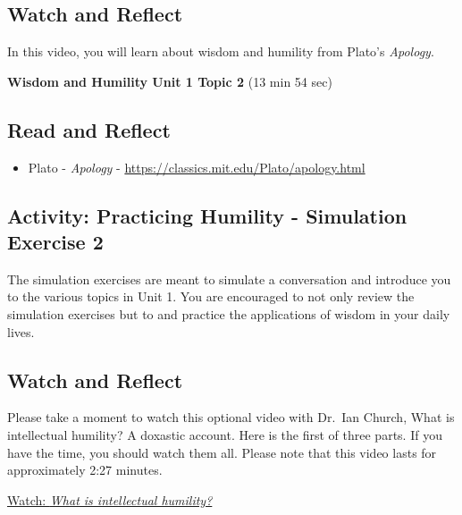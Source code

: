 \documentclass[
]{book}
\providecommand{\tightlist}{%
  \setlength{\itemsep}{0pt}\setlength{\parskip}{0pt}}
\begin{document}
\hypertarget{watch-and-reflect-1}{%
\subsection*{Watch and Reflect}\label{watch-and-reflect-1}}

In this video, you will learn about wisdom and humility from Plato's \emph{Apology}.

\textbf{Wisdom and Humility Unit 1 Topic 2} (13 min 54 sec)

\hypertarget{read-and-reflect-1}{%
\subsection*{Read and Reflect}\label{read-and-reflect-1}}

\begin{itemize}
\tightlist
\item
  Plato - \emph{Apology} - \url{https://classics.mit.edu/Plato/apology.html}
\end{itemize}

\hypertarget{activity-practicing-humility---simulation-exercise-2}{%
\subsection*{Activity: Practicing Humility - Simulation Exercise 2}\label{activity-practicing-humility---simulation-exercise-2}}

\begin{reflect}
The simulation exercises are meant to simulate a conversation and introduce you to the various topics in Unit 1. You are encouraged to not only review the simulation exercises but to and practice the applications of wisdom in your daily lives.
\end{reflect}

\hypertarget{watch-and-reflect-2}{%
\subsection*{Watch and Reflect}\label{watch-and-reflect-2}}

\begin{reflect}
Please take a moment to watch this optional video with Dr.~Ian Church, What is intellectual humility? A doxastic account. Here is the first of three parts. If you have the time, you should watch them all. Please note that this video lasts for approximately 2:27 minutes.

\href{https://www.youtube.com/watch?v=8CZIkGEJYRY}{Watch: \emph{What is intellectual humility?}}
\end{reflect}
\end{document}
